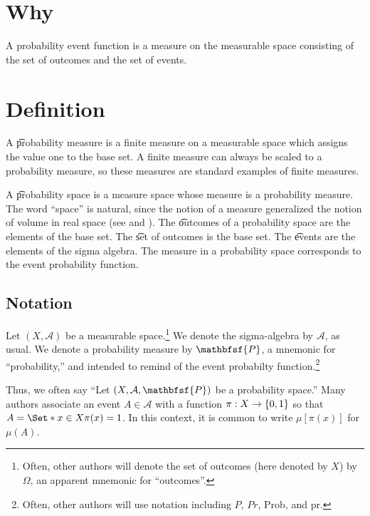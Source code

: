 
\section*{Why}

A probability event function is a measure on the measurable space consisting of the set of outcomes and the set of events.

\section*{Definition}

A \t{probability measure} is a finite measure on a measurable space which assigns the value one to the base set.
A finite measure can always be scaled to a probability measure, so these measures are standard examples of finite measures.

A \t{probability space} is a measure space whose measure is a probability measure.
The word ``space'' is natural, since the notion of a measure generalized the notion of volume in real space (see and ).
The \t{outcomes} of a probability space are the elements of the base set.
The \t{set of outcomes} is the base set.
The \t{events} are the elements of the sigma algebra.
The measure in a probability space corresponds to the event probability function.

\subsection*{Notation}

Let $(X, \mathcal{A} )$ be a measurable space.\footnote{Often, other authors will denote the set of outcomes (here denoted by $X$) by $\Omega $, an apparent mnemonic for ``outcomes''.}
We denote the sigma-algebra by $\mathcal{A} $, as usual.
We denote a probability measure by $\mathbfsf{P} $, a mnemonic for ``probability,'' and intended to remind of the event probabilty function.\footnote{Often, other authors will use notation including $P$, $Pr$, $\text{Prob}$, and $\text{pr}$.}

Thus, we often say ``Let $(X, \mathcal{A} , \mathbfsf{P} )$ be a probability space.''
Many authors associate an event $A \in \mathcal{A} $ with a function $\pi : X \to \{0, 1\}$ so that $A = \Set*{x \in X}{\pi (x) = 1}$.
In this context, it is common to write $\mu [\pi (x)]$ for $\mu (A)$.

\blankpage